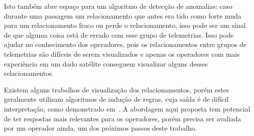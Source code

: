 Isto também abre espaço para um algoritmo de detecção de anomalias: caso durante uma passagem um relacionamento que antes era tido como forte muda para um relacionamento fraco ou perde o relacionamento, isso pode ser um sinal de que alguma coisa está de errado com esse grupo de telemetrias.
Isso pode ajudar no conhecimento dos operadores, pois os relacionamentos entre grupos de telemetrias são difíceis de serem visualizados e apenas os operadores com mais experiência em um dado satélite conseguem visualizar alguns desses relacionamentos.

Existem alguns trabalhos de visualização dos relacionamentos, porém estes geralmente utilizam algoritmos de indução de regras, cuja saída é de difícil interpretação, como demonstrado em~\cite{kannanMiningSatelliteTelemetry2016}.
A abordagem aqui proposta tem potencial de ter respostas mais relevantes para os operadores, porém precisa ser avaliada por um operador ainda, um dos próximos passos deste trabalho.

